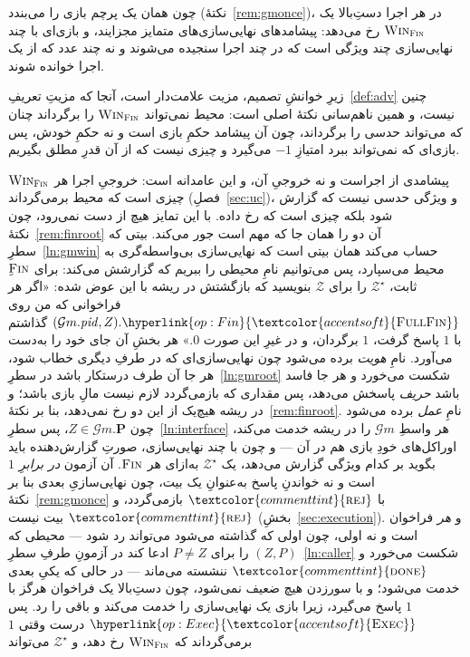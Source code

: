 \documentclass[10pt,oneside,openany]{book}
\newcommand{\Ps}{\mathbf{P}}
\newcommand{\PID}{\mathit{pid}}
\newcommand{\Zenv}{\mathcal{Z}}
\newcommand{\op}[1]{\textnormal{\textsc{#1}}}
\newcommand{\opl}[1]{\hyperlink{op:#1}{\textcolor{accentsoft}{\op{#1}}}}
\newcommand{\fopl}[1]{\hyperlink{op:#1}{\textcolor{accentsoft}{\op{Full}\op{#1}}}}
\newcommand{\atom}[1]{\textcolor{commenttint}{\op{#1}}}
\newcommand{\rej}{\atom{rej}}
\newcommand{\Gm}{\mathcal{G}m}
\newcommand{\Win}{\op{Win}}
\newcommand{\done}{\atom{done}}
\theoremstyle{accentdef}
\theoremstyle{accentplain}
\begin{document}
چون همان یک پرچم بازی را می‌بندد (نکتهٔ~\ref{rem:gmonce})، در هر اجرا
دستِ‌بالا یک $\Win_{\op{Fin}}$ رخ می‌دهد: پیشامدهای نهایی‌سازی‌های متمایز
مجزایند، و بازی‌ای با چند نهایی‌سازی چند ویژگی است که در چند اجرا سنجیده
می‌شوند و نه چند عدد که از یک اجرا خوانده شوند.

زیرِ خوانشِ تصمیم، مزیت علامت‌دار است، آنجا که مزیتِ تعریفِ~\ref{def:adv}
چنین نیست، و همین ناهم‌سانی نکتهٔ اصلی است: محیط نمی‌تواند
$\Win_{\op{Fin}}$ را برگرداند چنان که می‌تواند حدسی را برگرداند، چون آن
پیشامد حکمِ بازی است و نه حکمِ خودش، پس بازی‌ای که نمی‌تواند ببرد امتیازِ
$-1$ می‌گیرد و چیزی نیست که از آن قدرِ مطلق بگیریم.

$\Win_{\op{Fin}}$ پیشامدی از اجراست و نه خروجیِ آن، و این عامدانه است:
خروجیِ اجرا هر چیزی است که محیط برمی‌گرداند (فصلِ~\ref{sec:uc})، و ویژگی
حدسی نیست که گزارش شود بلکه چیزی است که رخ داده. با این تمایز هیچ از دست
نمی‌رود، چون نکتهٔ~\ref{rem:finroot} آن دو را همان جا که مهم است جور
می‌کند. بیتی که سطرِ~\ref{ln:gmwin} حساب می‌کند همان بیتی است که
نهایی‌سازی بی‌واسطه‌گری به محیط می‌سپارد، پس می‌توانیم نامِ محیطی را ببریم
که گزارشش می‌کند: برای $\op{Fin}$ِ ثابت، $\Zenv^{\star}$ را برای $\Zenv$
بنویسید که بازگشتش در ریشه با این عوض شده: «اگر هر فراخوانی که من روی
$(\Gm.\PID,Z).\fopl{Fin}$ گذاشتم با $1$ پاسخ گرفت، $1$ برگردان، و در غیرِ
این صورت $0$.» هر بخشِ آن جای خود را به‌دست می‌آورد. نامِ \emph{هویت} برده
می‌شود چون نهایی‌سازی‌ای که در طرفِ دیگری خطاب شود، هر جا آن طرف درستکار
باشد در سطرِ~\ref{ln:gmroot} شکست می‌خورد و هر جا فاسد باشد \emph{حریف}
پاسخش می‌دهد، پس مقداری که بازمی‌گردد لازم نیست مالِ بازی باشد؛ و در ریشه
هیچ‌یک از این دو رخ نمی‌دهد، بنا بر نکتهٔ~\ref{rem:finroot}. نامِ
\emph{عمل} برده می‌شود چون $Z \in \Gm.\Ps$، پس سطرِ~\ref{ln:interface} هر
واسطِ $\Gm$ را در ریشه خدمت می‌کند، اوراکل‌های خودِ بازی هم در آن --- و چون
با چند نهایی‌سازی، صورتِ گزارش‌دهنده باید بگوید بر کدام ویژگی گزارش
می‌دهد، یک $\Zenv^{\star}$ به‌ازای هر $\op{Fin}$. آن آزمون \emph{در برابرِ
$1$} است و نه خواندنِ پاسخ به‌عنوانِ یک بیت، چون نهایی‌سازیِ بعدی بنا بر
نکتهٔ~\ref{rem:gmonce} با $\rej$ بازمی‌گردد، و $\rej$ بیت نیست
(بخشِ~\ref{sec:execution}). و \emph{هر} فراخوان است و نه اولی، چون اولی که
گذاشته می‌شود می‌تواند رد شود --- محیطی که $(Z,P)$ را برای $P \neq Z$ ادعا
کند در آزمونِ طرفِ سطرِ~\ref{ln:caller} شکست می‌خورد و $\done$ ننشسته
می‌ماند --- در حالی که یکیِ بعدی خدمت می‌شود؛ و با سور‌زدن هیچ ضعیف
نمی‌شود، چون دستِ‌بالا یک فراخوان هرگز با $1$ پاسخ می‌گیرد، زیرا بازی یک
نهایی‌سازی را خدمت می‌کند و باقی را رد. پس $\opl{Exec}$ درست وقتی $1$
برمی‌گرداند که $\Win_{\op{Fin}}$ رخ دهد، و $\Zenv^{\star}$ می‌تواند
\end{document}
